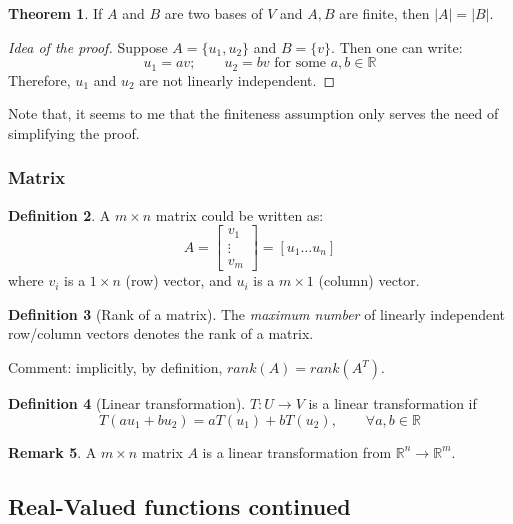 \documentclass[12pt]{article}
\newcommand{\R}{{\mathbb R}}
\theoremstyle{definition}
\newtheorem{theorem}{Theorem}[section]
\newtheorem{definition}[theorem]{Definition}
\newtheorem{remark}[theorem]{Remark}
\theoremstyle{plain}
\begin{document}
\begin{theorem}
    If $A$ and $B$ are two bases of $V$ and $A, B$ are finite, then $|A| = |B|$.
    \begin{proof}[Idea of the proof]
        Suppose $A = \{ u_1, u_2 \}$ and $B = \{v\}$. Then one can write:
        \[
            u_1 = a v; \qquad u_2 = bv \text{ for some } a, b\in \R
        \]
        Therefore, $u_1$ and $u_2$ are not linearly independent.

    \end{proof}

    Note that, it seems to me that the finiteness assumption only serves the
    need of simplifying the proof.
\end{theorem}

\subsubsection{Matrix}

\begin{definition}
    A $m \times n$ matrix could be written as:
    \[
        A =
    \begin{bmatrix}
        v_1 \\ \vdots \\ v_m
    \end{bmatrix}  =
    [u_1 \ldots u_n]
    \]
    where $v_i$ is a $1\times n$ (row) vector, and $u_i$ is a $m\times 1$
    (column) vector.
\end{definition}

\begin{definition}
    [Rank of a matrix] The \textit{maximum number} of linearly independent
    row/column vectors denotes the rank of a matrix.

    Comment: implicitly, by definition, $rank(A) = rank(A^T)$.

\end{definition}

\setcounter{theorem}{12}
\begin{definition}
    [Linear transformation] $T: U \to V$ is a linear transformation if
    \[ T(a u_1 + b u_2) =a T(u_1) + b T(u_2)
        , \qquad \forall a,b \in \R
    \]
\end{definition}

\begin{remark}
    A $m \times n$ matrix $A$ is a linear transformation from $\R^n \to \R^m$.
\end{remark}

\subsection{Real-Valued functions continued}
\setcounter{theorem}{0}
\end{document}
